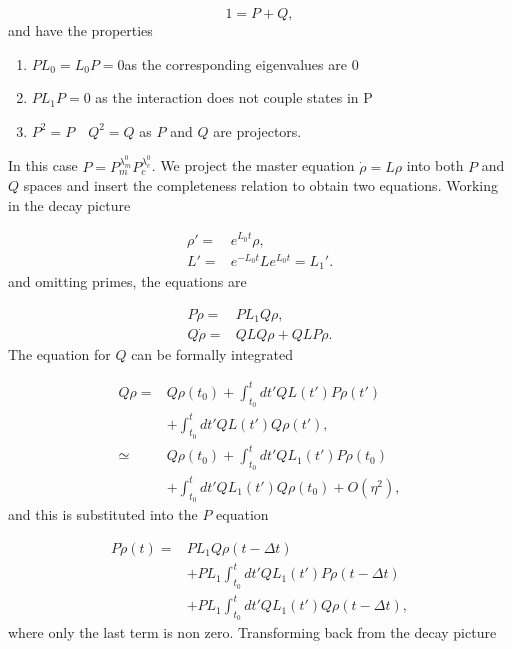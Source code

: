\documentclass[reprint, amsmath,amssymb, aps,pra]{revtex4-1}
\begin{document}
\begin{equation}
1 = P + Q,
\end{equation} and have the properties

\begin{enumerate}

\item $ PL_{0} = L_{0}P = 0 $\qquad as the corresponding eigenvalues are 0

\item $PL_{1}P=0$ \qquad as the interaction does not couple states in P

\item $P^2 = P \quad Q^2 = Q$ \qquad as $P$ and $Q$ are projectors.
\end{enumerate} In this case $P=P_m^{\lambda_m^0}P_c^{\lambda_c^0}$. We project the master equation $\dot{\rho}=L\rho$ into both $P$ and $Q$ spaces and insert the completeness relation to obtain two equations. Working in the decay picture

\begin{align*}
 \rho' =& e^{L_0t}\rho,\\
 L' =& e^{-L_0t}Le^{L_0t} = L_1'.
\end{align*} and omitting primes, the equations are

\begin{align*}
P\dot{\rho} =& PL_1Q\rho, \\
Q\dot{\rho} =& QLQ\rho + QLP\rho.
\end{align*} The equation for $Q$ can be formally integrated \cite{TesisMaestria}

\begin{align*}
Q\rho =& Q\rho(t_0) + \int_{t_0}^{t}dt' QL(t')P\rho(t')\\
       &+\int_{t_0}^{t}dt'QL(t')Q\rho(t'),\\
\simeq & Q\rho(t_0) + \int_{t_0}^{t}dt' QL_1(t')P\rho(t_0)\\
       &+\int_{t_0}^{t}dt'QL_1(t')Q\rho(t_0)+O(\eta^2),
\end{align*} and this is substituted into the $P$ equation

\begin{align}
P\dot{\rho}(t) =& PL_1Q\rho(t-\Delta t)\\ 
 &+ PL_1\int_{t_0}^{t}dt' QL_1(t')P\rho(t-\Delta t)\nonumber \\
 &+ PL_1\int_{t_0}^{t}dt'QL_1(t')Q\rho(t-\Delta t) \nonumber,
\end{align} where only the last term is non zero. Transforming back from the decay picture
\end{document}
